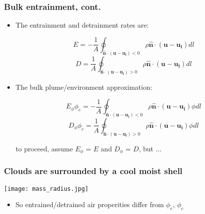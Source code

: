 \documentclass[fleqn,hyperref={colorlinks=true,linkcolor=blue,urlcolor=blue},numbers]{beamer}
\begin{document}
\begin{frame}
  \frametitle{Bulk entrainment, cont.}

  \begin{itemize}
  \item The entrainment and detrainment rates are:

\begin{equation*}
E = -\frac{1}{A}\oint_{\mathbf{\hat{n}}\cdot(\mathbf{u} - \mathbf{u_i}) < 0}
\rho\mathbf{\hat{n}}\cdot(\mathbf{u}-\mathbf{u_i})dl
\end{equation*}
\begin{equation*}
D = \frac{1}{A}\oint_{\mathbf{\hat{n}}\cdot(\mathbf{u} - \mathbf{u_i}) > 0}
\rho\mathbf{\hat{n}}\cdot(\mathbf{u}-\mathbf{u_i})dl
\end{equation*} \pause


\item The bulk plume/environment approximation:

\begin{equation*}
E_\phi \phi_e = -\frac{1}{A}\oint_{\mathbf{\hat{n}}\cdot(\mathbf{u} - \mathbf{u_i}) < 0}
\rho\mathbf{\hat{n}}\cdot(\mathbf{u}-\mathbf{u_i}) \phi dl
\end{equation*}
\begin{equation*}
D_\phi \phi_c = \frac{1}{A}\oint_{\mathbf{\hat{n}}\cdot(\mathbf{u} - \mathbf{u_i}) > 0}
\rho\mathbf{\hat{n}}\cdot(\mathbf{u}-\mathbf{u_i}) \phi dl
\end{equation*}

to proceed, assume  $E_\phi$ = $E$ and $D_\phi$ = $D$, but $\dots$
\end{itemize}


\end{frame}

\begin{frame}
  \frametitle{Clouds are surrounded by a cool moist shell }

\texttt{[image: mass\_radius.jpg]}

\pause
\begin{itemize}
\item So entrained/detrained air properities differ from $\phi_e$, $\phi_c$ 
\end{itemize}

\end{frame}
\end{document}
